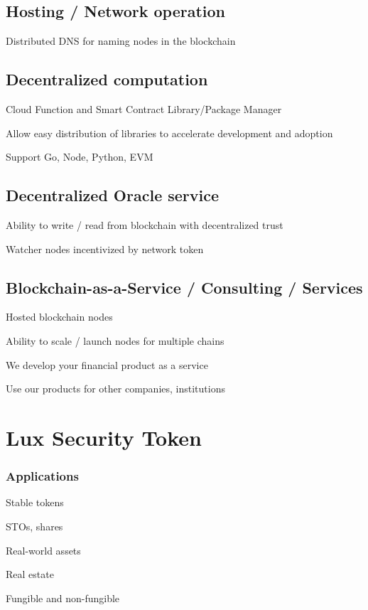\documentclass[11pt]{article}
\begin{document}
\subsection{Hosting / Network operation}

Distributed DNS for naming nodes in the blockchain


\subsection{Decentralized computation}

Cloud Function and Smart Contract Library/Package Manager


Allow easy distribution of libraries to accelerate development and adoption


Support Go, Node, Python, EVM


\subsection{Decentralized Oracle service}

Ability to write / read from blockchain with decentralized trust


Watcher nodes incentivized by network token


\subsection{Blockchain-as-a-Service / Consulting / Services}

Hosted blockchain nodes


Ability to scale / launch nodes for multiple chains


We develop your financial product as a service


Use our products for other companies, institutions


\section{Lux Security Token}

\subsubsection{Applications}

Stable tokens


STOs, shares


Real-world assets


Real estate


Fungible and non-fungible
\end{document}
